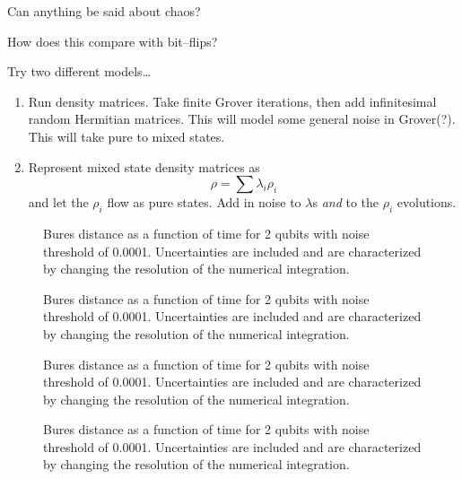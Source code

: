 Can anything be said about chaos?

How does this compare with bit--flips?

Try two different models\dots
\begin{enumerate}
\item Run density matrices.  Take finite Grover iterations, then add
infinitesimal random Hermitian matrices.  This will model some general
noise in Grover(?). This will take pure to mixed states.
\item Represent mixed state density matrices as
\begin{equation}
\rho = \sum\lambda_i\rho_i
\end{equation}
and let the $\rho_i$ flow as pure states.  Add in noise to $\lambda$s
{\sl and} to the $\rho_i$ evolutions.
\end{enumerate}


\begin{figure}
\begin{center}
\end{center}
\caption{Bures distance as a function of time for 2 qubits with noise
threshold of 0.0001.  Uncertainties are included and are characterized 
by changing the resolution of the numerical integration.}
\end{figure}

\begin{figure}
\begin{center}
\end{center}
\caption{Bures distance as a function of time for 2 qubits with noise
threshold of 0.0001.  Uncertainties are included and are characterized 
by changing the resolution of the numerical integration.}
\end{figure}

\begin{figure}
\begin{center}
\end{center}
\caption{Bures distance as a function of time for 2 qubits with noise
threshold of 0.0001.  Uncertainties are included and are characterized 
by changing the resolution of the numerical integration.}
\end{figure}

\begin{figure}
\begin{center}
\end{center}
\caption{Bures distance as a function of time for 2 qubits with noise
threshold of 0.0001.  Uncertainties are included and are characterized 
by changing the resolution of the numerical integration.}
\end{figure}

